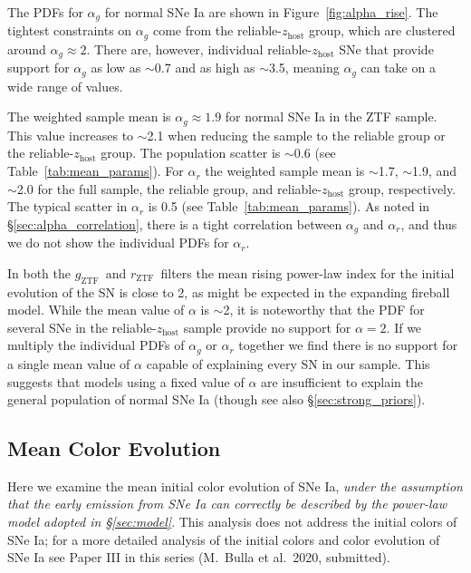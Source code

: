 \documentclass[twocolumn]{aastex63}
\newcommand{\rztf}{$r_\mathrm{ZTF}$}
\newcommand{\gztf}{$g_\mathrm{ZTF}$}
\begin{document}
The PDFs for $\alpha_g$ for normal SNe Ia are shown in
Figure~\ref{fig:alpha_rise}. The tightest constraints on $\alpha_g$ come from
the reliable-$z_\mathrm{host}$ group, which are clustered around $\alpha_g
\approx 2$. There are, however, individual reliable-$z_\mathrm{host}$ SNe that
provide support for $\alpha_g$ as low as $\sim$0.7 and as high as $\sim$3.5, meaning $\alpha_g$ can take on a wide range of values.

The weighted sample mean is $\alpha_g \approx 1.9$ for normal SNe Ia in the
ZTF sample. This value increases to $\sim$2.1 when reducing the sample to the
reliable group or the reliable-$z_\mathrm{host}$ group. The population scatter
is $\sim$0.6 (see Table~\ref{tab:mean_params}). For $\alpha_r$ the weighted
sample mean is $\sim$1.7, $\sim$1.9, and $\sim$2.0 for the full sample, the
reliable group, and reliable-$z_\mathrm{host}$ group, respectively. The
typical scatter in $\alpha_r$ is 0.5 (see Table~\ref{tab:mean_params}). As
noted in \S\ref{sec:alpha_correlation}, there is a tight correlation
between $\alpha_g$ and $\alpha_r$, and thus we do not show the individual PDFs
for $\alpha_r$.

In both the \gztf\ and \rztf\ filters the mean rising power-law index for the
initial evolution of the SN is close to 2, as might be expected in
the expanding fireball model. While the mean value of $\alpha$
is $\sim$2, it is noteworthy that the PDF for several SNe in the
reliable-$z_\mathrm{host}$ sample provide no support for $\alpha = 2$. If we
multiply the individual PDFs of $\alpha_g$ or $\alpha_r$ together we find
there is no support for a single mean value of $\alpha$ capable of explaining
every SN in our sample. This suggests that models using a fixed value of
$\alpha$ are insufficient to explain the general population of normal SNe Ia
(though see also \S\ref{sec:strong_priors}).



\subsection{Mean Color Evolution}\label{sec:colors}

Here we examine the mean initial color evolution of SNe Ia, \textit{under the
assumption that the early emission from SNe Ia can correctly be described by
the power-law model adopted in \S\ref{sec:model}}. This analysis does not
address the initial colors of SNe Ia; for a more detailed analysis of the
initial colors and color evolution of SNe Ia see Paper III in this series
(M.~Bulla et al.~2020, submitted).
\end{document}
